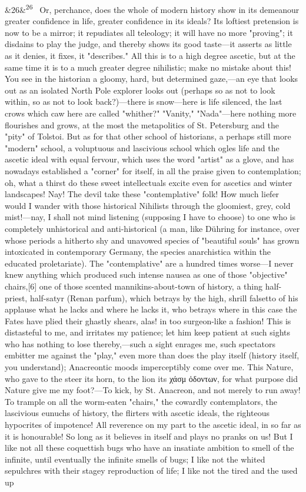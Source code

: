 \documentclass[12pt]{article}
\newcommand{\para}[1][]{\par\noindent\ifx&#1&\else\textsuperscript{\footnotesize #1}~\fi}
\begin{document}
\para[26] Or, perchance, does the whole of modern history show in its demeanour greater confidence in life, greater confidence in its ideals? Its loftiest pretension is now to be a mirror; it repudiates all teleology; it will have no more "proving"; it disdains to play the judge, and thereby shows its good taste---it asserts as little as it denies, it fixes, it "describes." All this is to a high degree ascetic, but at the same time it is to a much greater degree nihilistic; make no mistake about this! You see in the historian a gloomy, hard, but determined gaze,---an eye that looks out as an isolated North Pole explorer looks out (perhaps so as not to look within, so as not to look back?)---there is snow---here is life silenced, the last crows which caw here are called "whither?" "Vanity," "Nada"---here nothing more flourishes and grows, at the most the metapolitics of St. Petersburg and the "pity" of Tolstoi. But as for that other school of historians, a perhaps still more "modern" school, a voluptuous and lascivious school which ogles life and the ascetic ideal with equal fervour, which uses the word "artist" as a glove, and has nowadays established a "corner" for itself, in all the praise given to contemplation; oh, what a thirst do these sweet intellectuals excite even for ascetics and winter landscapes! Nay! The devil take these "contemplative" folk! How much liefer would I wander with those historical Nihilists through the gloomiest, grey, cold mist!---nay, I shall not mind listening (supposing I have to choose) to one who is completely unhistorical and anti-historical (a man, like Dühring for instance, over whose periods a hitherto shy and unavowed species of "beautiful souls" has grown intoxicated in contemporary Germany, the species anarchistica within the educated proletariate). The "contemplative" are a hundred times worse---I never knew anything which produced such intense nausea as one of those "objective" chairs,[6] one of those scented mannikins-about-town of history, a thing half-priest, half-satyr (Renan parfum), which betrays by the high, shrill falsetto of his applause what he lacks and where he lacks it, who betrays where in this case the Fates have plied their ghastly shears, alas! in too surgeon-like a fashion! This is distasteful to me, and irritates my patience; let him keep patient at such sights who has nothing to lose thereby,---such a sight enrages me, such spectators embitter me against the "play," even more than does the play itself (history itself, you understand); Anacreontic moods imperceptibly come over me. This Nature, who gave to the steer its horn, to the lion its χάσμ ὀδοντων, for what purpose did Nature give me my foot?---To kick, by St. Anacreon, and not merely to run away! To trample on all the worm-eaten "chairs," the cowardly contemplators, the lascivious eunuchs of history, the flirters with ascetic ideals, the righteous hypocrites of impotence! All reverence on my part to the ascetic ideal, in so far as it is honourable! So long as it believes in itself and plays no pranks on us! But I like not all these coquettish bugs who have an insatiate ambition to smell of the infinite, until eventually the infinite smells of bugs; I like not the whited sepulchres with their stagey reproduction of life; I like not the tired and the used up 
\end{document}
